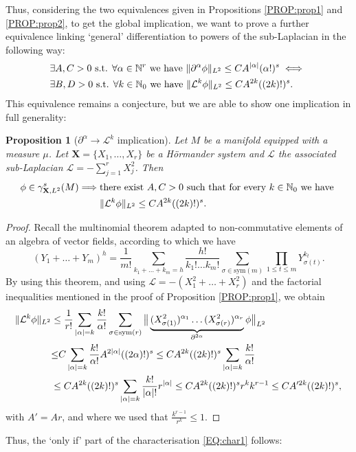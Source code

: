 \documentclass[12pt,oneside,a4paper]{book}
\numberwithin{equation}{section}     %
\theoremstyle{plain}
\newtheorem{proposition}[theorem]{Proposition}
\theoremstyle{definition}
\newcommand{\N}{{\mathbb N}}
\newcommand{\slp}{{\mathcal L}}
\begin{document}
Thus, considering the two equivalences given in Propositions \ref{PROP:prop1} and \ref{PROP:prop2}, to get the global implication, we want to prove a further equivalence linking `general' differentiation to powers of the sub-Laplacian in the following way:
\begin{align}\notag
&\exists A,C >0 \text{ s.t. }\forall\alpha\in\N^r\text{ we have }\|\partial^\alpha\phi\|_{L^2}\leq C A^{|\alpha|}(\alpha!)^s\iff\,\\\notag&\exists B,D>0\text{ s.t. }\forall k\in\N_0\text{ we have } \|\slp^{k}\phi\|_{L^2}\leq CA^{2k}((2k)!)^s.
\end{align}
This equivalence remains a conjecture, but we are able to show one implication in full generality:

\begin{proposition}[$\partial^\alpha\rightarrow\slp^k$ implication]\label{PROP:prop3}
	Let $M$ be a manifold equipped with a measure $\mu$. Let $\mathbf{X} =\{X_1,\dots,X_r\}$ be a H\"ormander system and $\slp$ the associated sub-Laplacian $\slp=-\sum_{j=1}^rX_j^2$. Then
	\begin{align}\notag
	\phi\in\gamma^s_{\mathbf{X},L^2}(M)\Longrightarrow\;&\text{there exist }A,C>0\text{ such that for every }k\in\N_0\text{ we have }\\\notag
	&\|\slp^{k}\phi\|_{L^2}\leq CA^{2k}((2k)!)^s.
	\end{align}
\end{proposition}

\begin{proof}
	Recall the multinomial theorem adapted to non-commutative elements of an algebra of vector fields, according to which we have
	\[
	(Y_1+\dots+Y_m)^h=\frac{1}{m!}\sum_{k_1+\dots+k_m=h}\frac{h!}{k_1!\dots k_m!}\sum_{\sigma\in \text{sym}(m)}\prod_{1\leq t \leq m}Y_{\sigma(t)}^{k_t}.
	\]
	By using this theorem, and using $\slp=-(X_1^2+\dots+X_r^2)$ and the factorial inequalities mentioned in the proof of Proposition \ref{PROP:prop1}, we obtain
	\begin{align*}
	\|\slp^k\phi\|_{L^2}&\leq\frac{1}{r!}\sum_{|\alpha|=k}\frac{k!}{\alpha!}\sum_{\sigma\in\text{sym}(r)}\big{\|}\underbrace{ (X_{\sigma(1)}^2)^{\alpha_1}\dots(X_{\sigma(r)}^2)^{\alpha_r} }_{\partial^{2\alpha}} \phi\big{\|}_{L^2} \\
	&{\leq}C\sum_{|\alpha|=k}\frac{k!}{\alpha!}A^{2|\alpha|}((2\alpha)!)^s\leq CA^{2k}((2k)!)^s\sum_{|\alpha|=k}\frac{k!}{\alpha!} \\
	&\leq CA^{2k}((2k)!)^s\sum_{|\alpha|=k}\frac{k!}{|\alpha|!}r^{|\alpha|}\leq CA^{2k}((2k)!)^sr^kk^{r-1}\leq CA'^{2k}((2k)!)^s,
	\end{align*}  
	with $A'=Ar$, and where we used that $\frac{k^{r-1}}{r^k}\leq 1$.
\end{proof}
Thus, the `only if' part of the characterisation \eqref{EQ:char1} follows:
\end{document}
